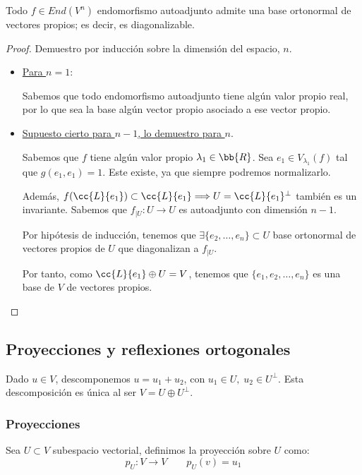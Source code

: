 \begin{teo}
    Todo $f\in End(V^n)$ endomorfismo autoadjunto admite una base ortonormal de vectores propios; es decir, es diagonalizable.
\end{teo}
\begin{proof}
    Demuestro por inducción sobre la dimensión del espacio, $n$.
    \begin{itemize}
        \item \underline{Para $n=1$}:
        
        Sabemos que todo endomorfismo autoadjunto tiene algún valor propio real, por lo que sea la base algún vector propio asociado a ese vector propio. 
        
        \item \underline{Supuesto cierto para $n-1$, lo demuestro para $n$}.

        Sabemos que $f$ tiene algún valor propio $\lambda_1 \in \bb{R}$. Sea $e_1\in V_{\lambda_1}(f)$ tal que $g(e_1,e_1)=1$. Este existe, ya que siempre podremos normalizarlo.

        Además, $f(\cc{L}\{e_1\})\subset \cc{L}\{e_1\} \Longrightarrow U=\cc{L}\{e_1\}^\perp$ también es un invariante. Sabemos que $f_{\left|U \right.}:U\to U$ es autoadjunto con dimensión $n-1$.

        Por hipótesis de inducción, tenemos que $\exists \{e_2, \dots, e_n\}\subset U$ base ortonormal de vectores propios de $U$ que diagonalizan a $f_{\left| U \right.}$.

        Por tanto, como $\cc{L}\{e_1\} \oplus U = V$, tenemos que $\{e_1,e_2,\dots,e_n\}$ es una base de $V$ de vectores propios.
    \end{itemize}
\end{proof}

\subsection{Proyecciones y reflexiones ortogonales}
Dado $u\in V$, descomponemos $u=u_1+u_2$, con $u_1\in U,\;u_2\in U^\perp$. Esta descomposición es única al ser $V=U\oplus U^\perp$.

\subsubsection{Proyecciones}
\begin{definicion}
Sea $U\subset V$ subespacio vectorial, definimos la proyección sobre $U$ como:
\begin{equation*}
    p_U:V\to V \qquad p_U(v) = u_1
\end{equation*}
\end{definicion}


